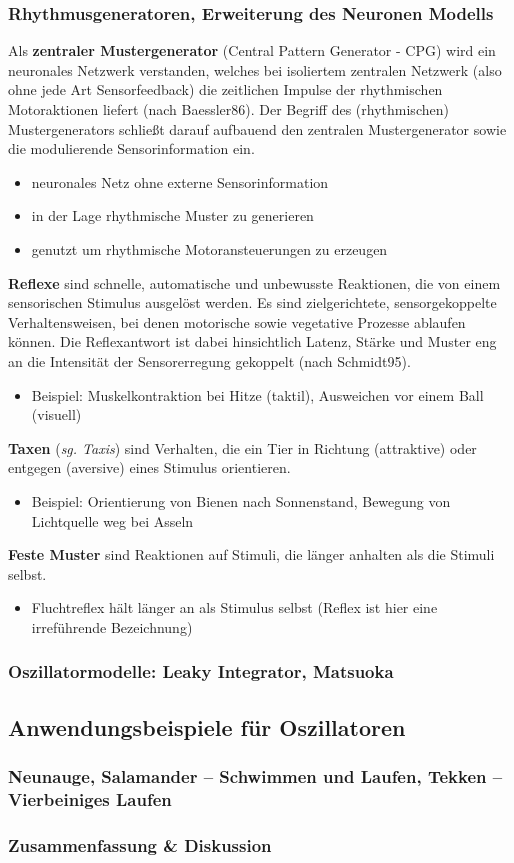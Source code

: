 \subsubsection{Rhythmusgeneratoren, Erweiterung des Neuronen Modells}
Als \textbf{zentraler Mustergenerator} (Central Pattern Generator - CPG)
wird ein neuronales Netzwerk verstanden, welches bei isoliertem
zentralen Netzwerk (also ohne jede Art Sensorfeedback) die zeitlichen
Impulse der rhythmischen Motoraktionen liefert (nach Baessler86). Der
Begriff des (rhythmischen) Mustergenerators schließt darauf
aufbauend den zentralen Mustergenerator sowie die modulierende
Sensorinformation ein.
\begin{itemize}
\item neuronales Netz ohne externe Sensorinformation
\item in der Lage rhythmische Muster zu generieren
\item genutzt um rhythmische Motoransteuerungen zu erzeugen
\end{itemize}
\textbf{Reflexe} sind schnelle, automatische und unbewusste Reaktionen,
die von einem sensorischen Stimulus ausgelöst werden. Es sind zielgerichtete, sensorgekoppelte Verhaltensweisen,
bei denen motorische sowie vegetative Prozesse ablaufen können.
Die Reflexantwort ist dabei hinsichtlich Latenz, Stärke und Muster
eng an die Intensität der Sensorerregung gekoppelt (nach Schmidt95).
\begin{itemize}
\item Beispiel: Muskelkontraktion bei Hitze (taktil), Ausweichen vor einem Ball (visuell)
\end{itemize}
\textbf{Taxen} (\textit{sg. Taxis}) sind Verhalten, die ein Tier in Richtung (attraktive) oder
entgegen (aversive) eines Stimulus orientieren.
\begin{itemize}
\item Beispiel: Orientierung von Bienen nach Sonnenstand, Bewegung von Lichtquelle weg bei Asseln
\end{itemize}
\textbf{Feste Muster} sind Reaktionen auf Stimuli, die länger anhalten als die Stimuli selbst.
\begin{itemize}
\item Fluchtreflex hält länger an als Stimulus selbst (\glqq Reflex\grqq{} ist hier eine irreführende Bezeichnung)
\end{itemize}

\subsubsection{Oszillatormodelle: Leaky Integrator, Matsuoka}
\subsection{Anwendungsbeispiele für Oszillatoren}
\subsubsection{Neunauge, Salamander – Schwimmen und Laufen, Tekken – Vierbeiniges Laufen}
\subsubsection{Zusammenfassung \& Diskussion}